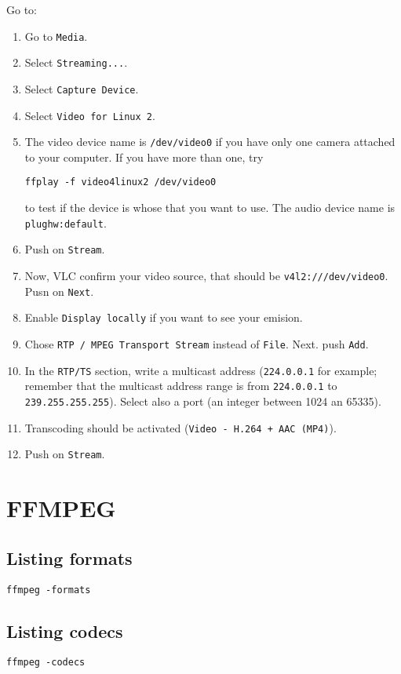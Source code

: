Go to:
\begin{enumerate}
\item Go to \texttt{Media}.
\item Select \texttt{Streaming...}.
\item Select \texttt{Capture Device}.
\item Select \texttt{Video for Linux 2}.
\item The video device name is \texttt{/dev/video0} if you have only
  one camera attached to your computer. If you have more than one, try
\begin{verbatim}
ffplay -f video4linux2 /dev/video0
\end{verbatim}
to test if the device is whose that you want to use.
The audio device name is \texttt{plughw:default}.
\item Push on \texttt{Stream}.
\item Now, VLC confirm your video source, that should be
  \texttt{v4l2:///dev/video0}. Pusn on \texttt{Next}.
\item Enable \texttt{Display locally} if you want to see your emision.
\item Chose \texttt{RTP / MPEG Transport Stream} instead of
  \texttt{File}. Next. push \texttt{Add}.
\item In the \texttt{RTP/TS} section, write a multicast address
  (\texttt{224.0.0.1} for example; remember that the multicast address
  range is from \texttt{224.0.0.1} to
  \texttt{239.255.255.255}). Select also a port (an integer between
  1024 an 65335).
\item Transcoding should be activated (\texttt{Video - H.264 + AAC
    (MP4)}).
\item Push on \texttt{Stream}.
\end{enumerate}

\section{FFMPEG}

\subsection{Listing formats}
\begin{verbatim}
ffmpeg -formats
\end{verbatim}

\subsection{Listing codecs}
\begin{verbatim}
ffmpeg -codecs
\end{verbatim}

